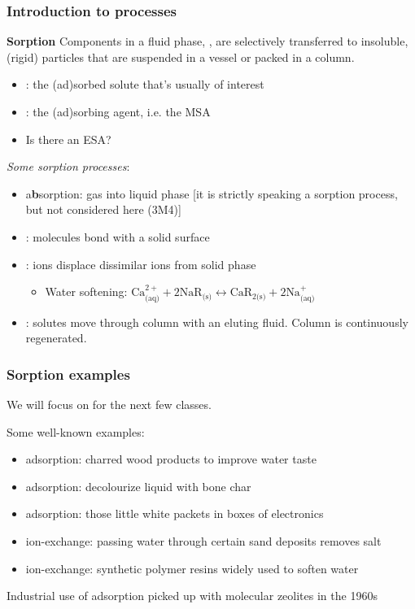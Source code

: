 \begin{frame}\frametitle{Introduction to \textbf{{\color{purple}{sorption}}} processes}
	\begin{exampleblock}{\textbf{Sorption}}
		Components in a fluid phase, {\color{myGreen}{solutes}}, are selectively transferred to insoluble, (rigid) particles that are suspended in a vessel or packed in a column.
	\end{exampleblock}
	\begin{itemize}
		\item	{\color{purple}{(ad)sorbate}}: the (ad)sorbed solute that's usually of interest
		\item	{\color{purple}{(ad)sorbent}}: the (ad)sorbing agent, i.e. the MSA
		\item	Is there an ESA?
	\end{itemize}

	\vspace{12pt}
	\emph{Some sorption processes}:
	\begin{itemize}
		\item	a\textbf{b}sorption: gas into liquid phase [it is strictly speaking a sorption process, but not considered here (3M4)]
		\item	{\color{purple}{adsorption}}: molecules bond with a solid surface
		\item	{\color{purple}{ion-exchange}}: ions displace dissimilar ions from solid phase
			\begin{itemize}
				\item	Water softening: $\text{Ca}^{2+}_\text{(aq)} + 2\text{NaR}_\text{(s)} \longleftrightarrow \text{CaR}_{2\text{(s)}} + 2\text{Na}^{+}_\text{(aq)}$
			\end{itemize}
		\item	{\color{purple}{chromatography}}: solutes move through column with an eluting fluid. Column is continuously regenerated.
	\end{itemize}
\end{frame}

\begin{frame}\frametitle{Sorption examples}
	\begin{exampleblock}{}
		We will focus on {\color{myGreen}{(ad)sorption}} for the next few classes.
	\end{exampleblock}

	\vspace{12pt}
	Some well-known examples:
	\begin{itemize}
		\item	adsorption: charred wood products to improve water taste
		\item	adsorption: decolourize liquid with bone char
		\item	adsorption: those little white packets in boxes of electronics
		\item	ion-exchange: passing water through certain sand deposits removes salt
		\item	ion-exchange: synthetic polymer resins widely used to soften water
	\end{itemize}

	Industrial use of adsorption picked up with molecular zeolites in the 1960s
\end{frame}

